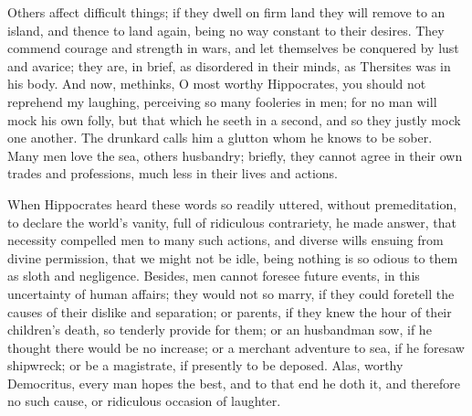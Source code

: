 {Others affect difficult things; if they dwell on firm land they
will remove to an island, and thence to land again, being no way
constant to their desires. They commend courage and strength in wars,
and let themselves be conquered by lust and avarice; they are, in
brief, as disordered in their minds, as Thersites was in his body. And
now, methinks, O most worthy Hippocrates, you should not reprehend my
laughing, perceiving so many fooleries in men; for no man will
mock his own folly, but that which he seeth in a second, and so they
justly mock one another. The drunkard calls him a glutton whom he knows
to be sober. Many men love the sea, others husbandry; briefly, they
cannot agree in their own trades and professions, much less in their
lives and actions.

When Hippocrates heard these words so readily uttered, without
premeditation, to declare the world's vanity, full of ridiculous
contrariety, he made answer, that necessity compelled men to many such
actions, and diverse wills ensuing from divine permission, that we might
not be idle, being nothing is so odious to them as sloth and
negligence. Besides, men cannot foresee future events, in this
uncertainty of human affairs; they would not so marry, if they could
foretell the causes of their dislike and separation; or parents, if
they knew the hour of their children's death, so tenderly provide for
them; or an husbandman sow, if he thought there would be no increase;
or a merchant adventure to sea, if he foresaw shipwreck; or be a
magistrate, if presently to be deposed. Alas, worthy Democritus, every
man hopes the best, and to that end he doth it, and therefore no such
cause, or ridiculous occasion of laughter.

}
